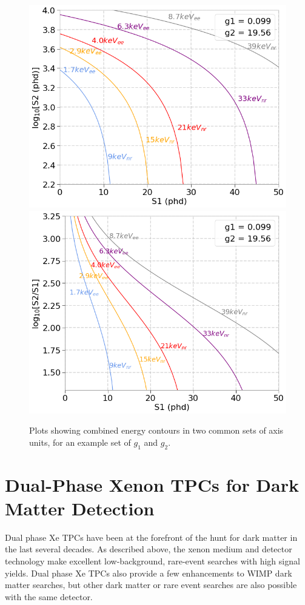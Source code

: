 \begin{figure}[htbp]
\begin{center}
\includegraphics[width=\halffig]{figures/lxetpcs/E_contours.png}
\includegraphics[width=\halffig]{figures/lxetpcs/E_contours2.png}
\caption{Plots showing combined energy contours in two common sets of axis units, for an example set of $g_{1}$ and $g_{2}$.}
\label{fig:e_contours}
\end{center}
\end{figure}




\section{Dual-Phase Xenon TPCs for Dark Matter Detection}
Dual phase Xe \ac{TPC}s have been at the forefront of the hunt for dark matter in the last several decades. As described above, the xenon medium and detector technology make excellent low-background, rare-event searches with high signal yields. Dual phase Xe \ac{TPC}s also provide a few enhancements to WIMP dark matter searches, but other dark matter or rare event searches are also possible with the same detector.


